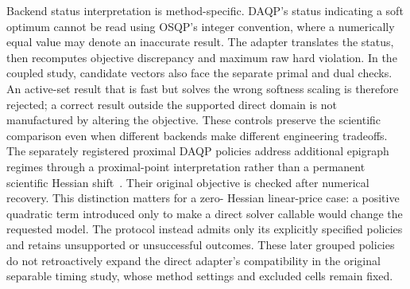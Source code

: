Backend status interpretation is method-specific. DAQP's status indicating a
soft optimum cannot be read using OSQP's integer convention, where a numerically
equal value may denote an inaccurate result. The adapter translates the status,
then recomputes objective discrepancy and maximum raw hard violation. In the
coupled study, candidate vectors also face the separate primal and dual checks.
An active-set result that is fast but solves the wrong softness scaling is
therefore rejected; a correct result outside the supported direct domain is not
manufactured by altering the objective. These controls preserve the scientific
comparison even when different backends make different engineering tradeoffs.
The separately registered proximal DAQP policies address additional epigraph
regimes through a proximal-point interpretation rather than a permanent
scientific Hessian shift~\cite{daqpprox,rockafellarppa}. Their original objective
is checked after numerical recovery. This distinction matters for a zero-
Hessian linear-price case: a positive quadratic term introduced only to
make a direct solver callable would change the requested model. The protocol
instead admits only its explicitly specified policies and retains unsupported
or unsuccessful outcomes. These later grouped policies do not retroactively
expand the direct adapter's compatibility in the original separable timing
study, whose method settings and excluded cells remain fixed.
